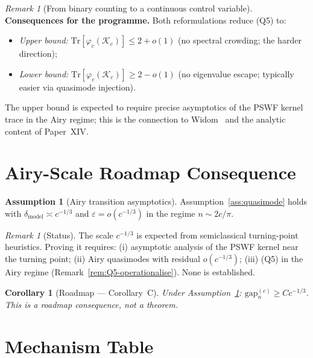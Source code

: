 \documentclass[12pt,a4paper]{amsart}
\newtheorem{corollary}[theorem]{Corollary}
\theoremstyle{definition}
\newtheorem{assumption}[theorem]{Assumption}
\theoremstyle{remark}
\newtheorem{remark}[theorem]{Remark}
\newcommand{\Kc}{\mathcal{K}_c}
\newcommand{\gap}[2]{\mathrm{gap}_{#2}^{(#1)}}
\newcommand{\Tr}{\mathrm{Tr}}
\begin{document}
\begin{remark}[From binary counting to a continuous control variable]
\medskip
\noindent\textbf{Consequences for the programme.}
Both reformulations reduce (Q5) to:
\begin{itemize}[nosep]
  \item \emph{Upper bound:} $\Tr[\varphi_c(\Kc)] \leq 2 + o(1)$
    (no spectral crowding; the harder direction);
  \item \emph{Lower bound:} $\Tr[\varphi_c(\Kc)] \geq 2 - o(1)$
    (no eigenvalue escape; typically easier via quasimode injection).
\end{itemize}
The upper bound is expected to require precise
asymptotics of the PSWF kernel trace in the Airy regime;
this is the connection to Widom~\cite{Widom1964}
and the analytic content of Paper~XIV.
\end{remark}

\section{Airy-Scale Roadmap Consequence}
\label{sec:airy}

\begin{assumption}[Airy transition asymptotics]
\label{ass:airy}
Assumption~\ref{ass:quasimode} holds with
$\delta_{\mathrm{model}} \asymp c^{-1/3}$ and $\varepsilon = o(c^{-1/3})$
in the regime $n \sim 2c/\pi$.
\end{assumption}

\begin{remark}[Status]
The scale $c^{-1/3}$ is expected from semiclassical turning-point
heuristics. Proving it requires: (i) asymptotic analysis of the
PSWF kernel near the turning point; (ii) Airy quasimodes with
residual $o(c^{-1/3})$; (iii) (Q5) in the Airy regime
(Remark~\ref{rem:Q5-operationalise}).
None is established.
\end{remark}

\begin{corollary}[Roadmap --- Corollary~C]
\label{cor:C}
Under Assumption~\ref{ass:airy}:
$\gap{c}{n} \geq Cc^{-1/3}$.
This is a roadmap consequence, not a theorem.
\end{corollary}

\section{Mechanism Table}
\label{sec:hierarchy}
\end{document}
